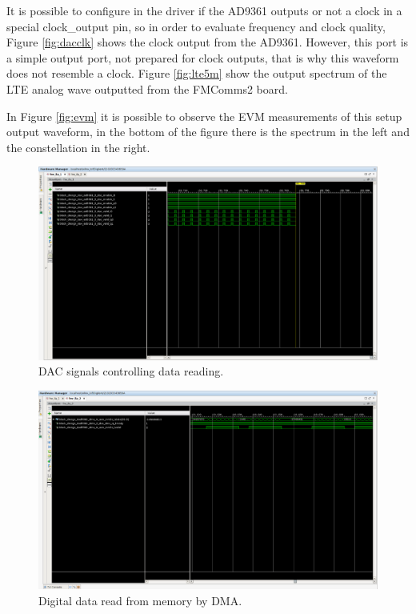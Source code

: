 It is possible to configure in the driver if the AD9361 outputs or not a clock
in a special clock\_output pin, so in order to evaluate frequency and clock
quality, Figure \ref{fig:dacclk} shows the clock output from the AD9361.
However, this port is a simple output port, not prepared for clock outputs, that
is why this waveform does not resemble a clock. Figure \ref{fig:lte5m} show the
output spectrum of the LTE analog wave outputted from the FMComms2 board.

In Figure \ref{fig:evm} it is possible to observe the EVM measurements of this
setup output waveform, in the bottom of the figure there is the spectrum in the
left and the constellation in the right.

\begin{figure}[htbp]
    \centering
    \includegraphics[width=1\textwidth,
    trim={{.15\textwidth} {1.2\textwidth} {.7\textwidth} {.16\textwidth}},
    clip]{./figures/dac_signals}
    \caption{ DAC signals controlling data reading.
    \label{fig:dacsignals}}
\end{figure}

\begin{figure}[htbp]
    \centering
    \includegraphics[width=1\textwidth,
    trim={{.15\textwidth} {1.3\textwidth} {.05\textwidth} {.16\textwidth}},
    clip]{./figures/ila_dataflow}
    \caption{ Digital data read from memory by DMA.
    \label{fig:dataflowdig}}
\end{figure}

